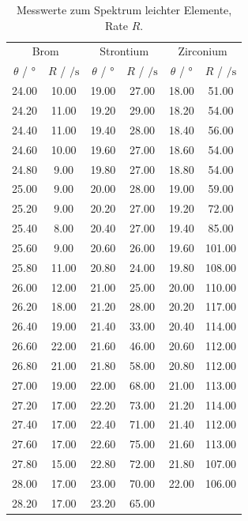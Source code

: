 \begin{table}
  \centering
  \caption{Messwerte zum Spektrum leichter Elemente, Rate $R$.}
  \label{tab:leichteElemente}
  \begin{tabular}{c c | c c | c c}
    \toprule
    \multicolumn{2}{c}{Brom} & \multicolumn{2}{c}{Strontium} & \multicolumn{2}{c}{Zirconium} \\
    $\theta$ / $\si{\degree}$ & $R$ / $\si{\per\second}$ & $\theta$ / $\si{\degree}$ & $R$ / $\si{\per\second}$ & $\theta$ / $\si{\degree}$ & $R$ / $\si{\per\second}$ \\
    \midrule
    24.00 & 10.00 & 19.00 & 27.00 & 18.00 & 51.00 \\
    24.20 & 11.00 & 19.20 & 29.00 & 18.20 & 54.00 \\
    24.40 & 11.00 & 19.40 & 28.00 & 18.40 & 56.00 \\
    24.60 & 10.00 & 19.60 & 27.00 & 18.60 & 54.00 \\
    24.80 & 9.00 & 19.80 & 27.00 & 18.80 & 54.00 \\
    25.00 & 9.00 & 20.00 & 28.00 & 19.00 & 59.00 \\
    25.20 & 9.00 & 20.20 & 27.00 & 19.20 & 72.00 \\
    25.40 & 8.00 & 20.40 & 27.00 & 19.40 & 85.00 \\
    25.60 & 9.00 & 20.60 & 26.00 & 19.60 & 101.00 \\
    25.80 & 11.00 & 20.80 & 24.00 & 19.80 & 108.00 \\
    26.00 & 12.00 & 21.00 & 25.00 & 20.00 & 110.00 \\
    26.20 & 18.00 & 21.20 & 28.00 & 20.20 & 117.00 \\
    26.40 & 19.00 & 21.40 & 33.00 & 20.40 & 114.00 \\
    26.60 & 22.00 & 21.60 & 46.00 & 20.60 & 112.00 \\
    26.80 & 21.00 & 21.80 & 58.00 & 20.80 & 112.00 \\
    27.00 & 19.00 & 22.00 & 68.00 & 21.00 & 113.00 \\
    27.20 & 17.00 & 22.20 & 73.00 & 21.20 & 114.00 \\
    27.40 & 17.00 & 22.40 & 71.00 & 21.40 & 112.00 \\
    27.60 & 17.00 & 22.60 & 75.00 & 21.60 & 113.00 \\
    27.80 & 15.00 & 22.80 & 72.00 & 21.80 & 107.00 \\
    28.00 & 17.00 & 23.00 & 70.00 & 22.00 & 106.00 \\
    28.20 & 17.00 & 23.20 & 65.00 & & \\

\end{tabular}
\end{table}
